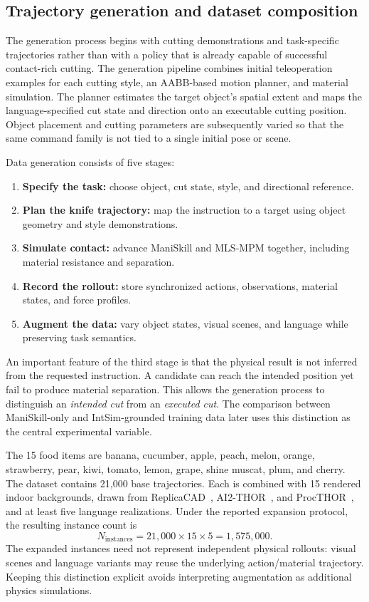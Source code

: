 \subsection{Trajectory generation and dataset composition}
\label{subsec:cut_dataset}

The generation process begins with cutting demonstrations and task-specific trajectories rather than with a policy that is already capable of successful contact-rich cutting. The generation pipeline combines initial teleoperation examples for each cutting style, an AABB-based motion planner, and material simulation. The planner estimates the target object's spatial extent and maps the language-specified cut state and direction onto an executable cutting position. Object placement and cutting parameters are subsequently varied so that the same command family is not tied to a single initial pose or scene.

Data generation consists of five stages:
\begin{enumerate}
  \item \textbf{Specify the task:} choose object, cut state, style, and directional reference.
  \item \textbf{Plan the knife trajectory:} map the instruction to a target using object geometry and style demonstrations.
  \item \textbf{Simulate contact:} advance ManiSkill and MLS-MPM together, including material resistance and separation.
  \item \textbf{Record the rollout:} store synchronized actions, observations, material states, and force profiles.
  \item \textbf{Augment the data:} vary object states, visual scenes, and language while preserving task semantics.
\end{enumerate}

An important feature of the third stage is that the physical result is not inferred from the requested instruction. A candidate can reach the intended position yet fail to produce material separation. This allows the generation process to distinguish an \emph{intended cut} from an \emph{executed cut}. The comparison between ManiSkill-only and IntSim-grounded training data later uses this distinction as the central experimental variable.

The 15 food items are banana, cucumber, apple, peach, melon, orange, strawberry, pear, kiwi, tomato, lemon, grape, shine muscat, plum, and cherry. The dataset contains 21,000 base trajectories. Each is combined with 15 rendered indoor backgrounds, drawn from ReplicaCAD~\cite{szot2021habitat}, AI2-THOR~\cite{kolve2017ai2}, and ProcTHOR~\cite{deitke2022}, and at least five language realizations. Under the reported expansion protocol, the resulting instance count is
\begin{equation}\label{eq:cut_dataset_size}
  N_{\mathrm{instances}}
   =21{,}000\times15\times5
   =1{,}575{,}000.
\end{equation}
The expanded instances need not represent independent physical rollouts: visual scenes and language variants may reuse the underlying action/material trajectory. Keeping this distinction explicit avoids interpreting augmentation as additional physics simulations.

